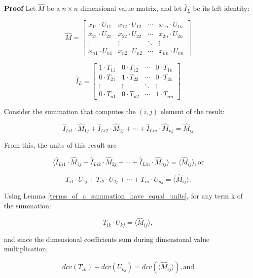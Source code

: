 \documentclass[10pt,letterpaper]{article}
\newenvironment{proof}{\noindent\textbf{Proof} }{\qed \newline}
\newcommand{\qed}{\nobreak \ifvmode \relax \else
      \ifdim\lastskip<1.5em \hskip-\lastskip
      \hskip1.5em plus0em minus0.5em \fi \nobreak
      \vrule height0.75em width0.5em depth0.25em\fi}
\numberwithin{equation}{section}
\begin{document}
\begin{proof}Let $\hat M$ be a $n \times n$ dimensional value matrix,
  and let $\hat I_L$ be its left identity:

\[ \hat M = \left[ \begin{matrix} 
  x_{11} \cdot U_{11} & x_{12} \cdot U_{12} & \cdots & x_{1n} \cdot U_{1n} \\
  x_{21} \cdot U_{21} & x_{22} \cdot U_{22} & \cdots & x_{2n} \cdot U_{2n} \\
  \vdots & \vdots & \ddots & \vdots \\
  x_{n1} \cdot U_{n1} & x_{n2} \cdot U_{n2} & \cdots & x_{nn} \cdot U_{nn}
 \end{matrix} \right] \]

\[ \hat I_L = \left[ \begin{matrix} 
  1 \cdot T_{11} & 0 \cdot T_{12} & \cdots & 0 \cdot T_{1n} \\
  0 \cdot T_{21} & 1 \cdot T_{22} & \cdots & 0 \cdot T_{2n} \\
  \vdots & \vdots & \ddots & \vdots \\
  0 \cdot T_{n1} & 0 \cdot T_{n2} & \cdots & 1 \cdot T_{nn}
 \end{matrix} \right] \]

Consider the summation that computes the $(i, j)$ element of the
result:

\[ \hat I_{Li1} \cdot \hat M_{1j} + \hat I_{Li2} \cdot \hat M_{2j} + \cdots + \hat I_{Lin} \cdot \hat M_{nj} = \hat M_{ij} \]

From this, the units of this result are

\[ \langle \hat I_{Li1} \cdot \hat M_{1j} + \hat I_{Li2} \cdot \hat M_{2j} + \cdots + \hat I_{Lin} \cdot \hat M_{nj} \rangle = \langle \hat M_{ij} \rangle , \mbox{or} \]

\[ T_{i1} \cdot U_{1j} + T_{i2} \cdot U_{2j} + \cdots + T_{in} \cdot U_{nj} = \langle \hat M_{ij} \rangle . \]

Using Lemma \ref{terms_of_a_summation_have_equal_units}, for any term
k of the summation:

\[ T_{ik} \cdot U_{kj} = \langle \hat M_{ij} \rangle , \]

and since the dimensional coefficients sum during dimensional value
multiplication,

\begin{equation} \label{basic_equation_1_for_left_identity_ddv_proof} dcv(T_{ik}) + dcv(U_{kj}) = dcv( \langle \hat M_{ij} \rangle ) , \mbox{and} \end{equation}


\end{proof}
\end{document}
